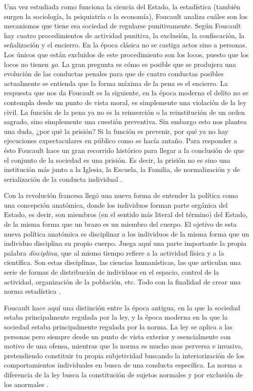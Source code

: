 \documentclass[11pt]{article}
\begin{document}
Una vez estudiada como funciona la ciencia del Estado, la estadística (también surgen la sociología, la psiquiatría o la economía), Foucault analiza cuáles son los mecanismos que tiene esa sociedad de regularse punitivamente. Según Foucault hay cuatro procedimientos de actividad punitiva, la exclusión, la confiscación, la señalización y el encierro. En la época clásica no se castiga actos sino a personas. Los únicos que están excluidos de este procedimiento son los locos, puesto que los locos no tienen \textit{yo}. La gran pregunta es cómo es posible que se produjera una evolución de las conductas penales para que de cuatro conductas posibles actualmente se entienda que la forma máxima de la pena es el encierro. La respuesta que nos da Foucault es la siguiente, en la época moderna el delito no se contempla desde un punto de vista moral, es simplemente una violación de la ley civil. La función de la pena ya no es la reinserción o la reinstitución de un orden sagrado, sino simplemente una cuestión preventiva. Sin embargo esto nos plantea una duda, ¿por qué la prisión? Si la función es prevenir, por qué ya no hay ejecuciones expectaculares en público como se hacía antaño. Para responder a ésto Foucault hace un gran recorrido histórico para llegar a la conclusión de que el conjunto de la sociedad es una prisión. Es decir, la prisión no es sino una institución más junto a la Iglesia, la Escuela, la Familia, de normalización y de serialización de la conducta individual \cite{ernesto-foucault}.

Con la revolución francesa llegó una nueva forma de entender la política como una concepción anatómica, donde los individuos forman parte orgánica del Estado, es decir, son miembros (en el sentido más literal del término) del Estado, de la misma forma que un brazo es un miembro del cuerpo. El ojetivo de esta nueva política anatómica es disciplinar a los individuos de la misma forma que un individuo disciplina su propio cuerpo. Juega aquí una parte importante la propia palabra \textit{disciplina}, que al mismo tiempo refiere a la actividad física y a la científica. Son estas disciplinas, las ciencias humanísticas, las que articulan una serie de formas de distribución de individuos en el espacio, control de la actividad, organización de la población, etc. Todo con la finalidad de crear una norma estadística \cite{ernesto-foucault}.

Foucault hace aquí una distinción entre la época antigua, en la que la sociedad estaba principalmente regulada por la ley, y la época moderna en la que la sociedad estaba principalmente regulada por la norma. La ley se aplica a las personas pero siempre desde un punto de vista exterior y esencialmente con motivo de una ofensa, mientras que la norma es mucho mas perversa e invasiva, pretendiendo constituir tu propia subjetividad buscando la interiorización de los comportamientos individuales en busca de una conducta específica. La norma a diferencia de la ley busca la constitución de sujetos normales y por exclusión de los anormales \cite{ernesto-foucault}.
\end{document}
